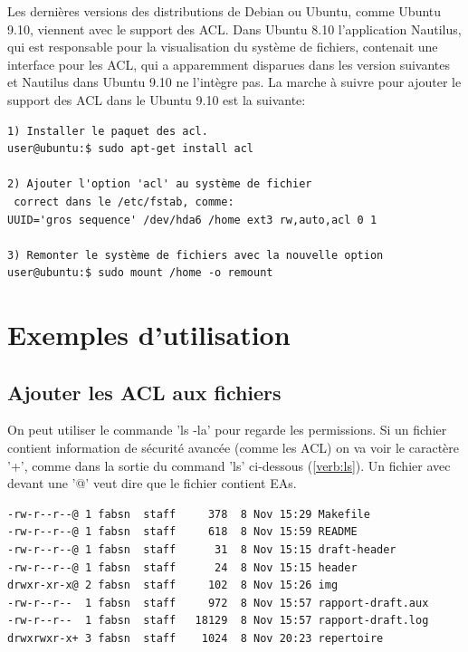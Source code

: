\documentclass{article}
\begin{document}
Les dernières versions des distributions de Debian ou Ubuntu, comme Ubuntu 9.10, viennent avec le support des ACL. Dans Ubuntu 8.10 l'application Nautilus, qui est responsable pour la visualisation du système de fichiers, contenait une interface pour les ACL, qui a apparemment disparues dans les version suivantes et Nautilus dans Ubuntu 9.10 ne l'intègre pas. La marche à suivre pour ajouter le support des ACL dans le Ubuntu 9.10 est la suivante:

\begin{verbatim}
1) Installer le paquet des acl. 
user@ubuntu:$ sudo apt-get install acl

2) Ajouter l'option 'acl' au système de fichier
 correct dans le /etc/fstab, comme:
UUID='gros sequence' /dev/hda6 /home ext3 rw,auto,acl 0 1

3) Remonter le système de fichiers avec la nouvelle option
user@ubuntu:$ sudo mount /home -o remount

\end{verbatim}

\section{Exemples d'utilisation}
\subsection{Ajouter les ACL aux fichiers}

On peut utiliser le commande 'ls -la' pour regarde les permissions. Si un fichier contient information de sécurité avancée (comme les ACL) on va voir le caractère '+', comme dans la sortie du command 'ls' ci-dessous (\ref{verb:ls}). Un fichier avec devant une '@' veut dire que le fichier contient EAs. 

\begin{center}
\label{verb:ls}
\begin{verbatim}
-rw-r--r--@ 1 fabsn  staff     378  8 Nov 15:29 Makefile
-rw-r--r--@ 1 fabsn  staff     618  8 Nov 15:59 README
-rw-r--r--@ 1 fabsn  staff      31  8 Nov 15:15 draft-header
-rw-r--r--@ 1 fabsn  staff      24  8 Nov 15:15 header
drwxr-xr-x@ 2 fabsn  staff     102  8 Nov 15:26 img
-rw-r--r--  1 fabsn  staff     972  8 Nov 15:57 rapport-draft.aux
-rw-r--r--  1 fabsn  staff   18129  8 Nov 15:57 rapport-draft.log
drwxrwxr-x+ 3 fabsn  staff	  1024  8 Nov 20:23 repertoire
\end{verbatim}
\end{center}
\end{document}

